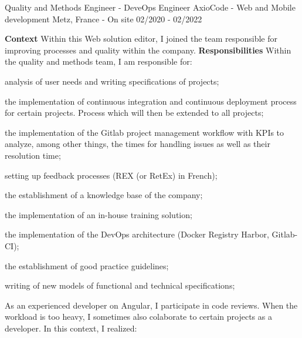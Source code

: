\begin{cventries}
  \cventry
    {Quality and Methods Engineer - DeveOps Engineer} %
    {AxioCode - Web and Mobile development} %
    {Metz, France - On site} %
    {02/2020 - 02/2022} %
    {
      \textbf{Context}
      \newline
      Within this Web solution editor, I joined the team responsible for improving processes
      and quality within the company.
      \newline \vspace{2pt}
      \textbf{Responsibilities}
      \newline \vspace{2pt}
      Within the quality and methods team, I am responsible for:
      \newline \vspace{12pt}
      \begin{cvitems}
        \item {analysis of user needs and writing specifications of projects;}
        \item {the implementation of continuous integration and continuous deployment process for certain projects. Process which will then be extended to all projects;}
        \item {the implementation of the Gitlab project management workflow with KPIs to analyze, among other things, the times for handling issues as well as their resolution time;}
        \item {setting up feedback processes (REX (or RetEx) in French);}
        \item {the establishment of a knowledge base of the company;}
        \item {the implementation of an in-house training solution;}
        \item {the implementation of the DevOps architecture (Docker Registry Harbor, Gitlab-CI);}
        \item {the establishment of good practice guidelines;}
        \item {writing of new models of functional and technical specifications;}
      \end{cvitems}
      As an experienced developer on Angular, I participate in code reviews. When the 
      workload is too heavy, I sometimes also colaborate to certain projects as a 
      developer. In this context, I realized:
      \newline \vspace{12pt}
}
\end{cventries}
